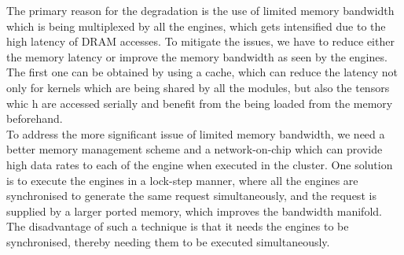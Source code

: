 \documentclass[a4paper,12pt, final]{report}
\begin{document}
The primary reason for the degradation is the use of limited memory bandwidth which is being multiplexed by all the engines, which gets intensified due to the high latency of DRAM accesses. To mitigate the issues, we have to reduce either the memory latency or improve the memory bandwidth as seen by the engines. The first one can be obtained by using a cache, which can reduce the latency not only for kernels which are being shared by all the modules, but also the tensors whic h are accessed serially and benefit from the being loaded from the memory beforehand.
\\

To address the more significant issue of limited memory bandwidth, we need a better memory management scheme and a network-on-chip which can provide high data rates to each of the engine when executed in the cluster. One solution is to execute the engines in a lock-step manner, where all the engines are synchronised to generate the same request simultaneously, and the request is supplied by a larger ported memory, which improves the bandwidth manifold. The disadvantage of such a technique is that it needs the engines to be synchronised, thereby needing them to be executed simultaneously.
\end{document}
